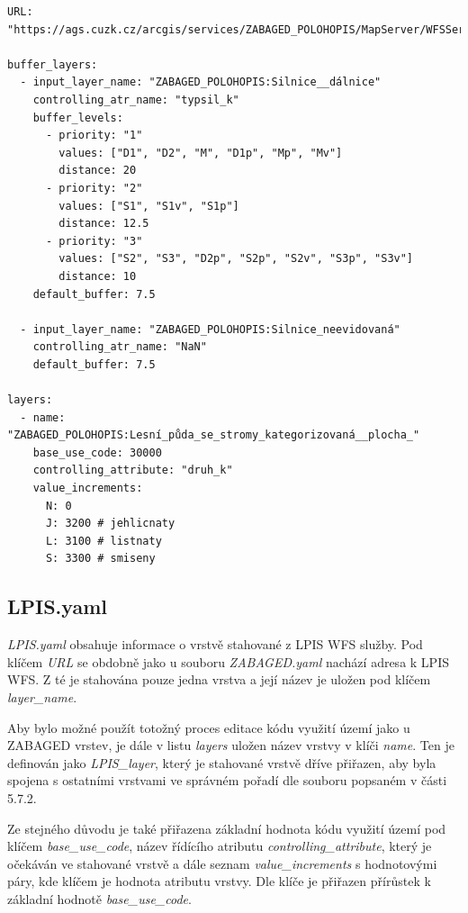 \documentclass[a4paper,oneside,12pt]{book}
\begin{document}
\begin{lstlisting}[style=myyaml, caption={Ukázka ZABAGED.yaml},label={kod:ZABAGED.yaml}]
URL: "https://ags.cuzk.cz/arcgis/services/ZABAGED_POLOHOPIS/MapServer/WFSServer"

buffer_layers:
  - input_layer_name: "ZABAGED_POLOHOPIS:Silnice__dálnice"
    controlling_atr_name: "typsil_k"
    buffer_levels:
      - priority: "1"
        values: ["D1", "D2", "M", "D1p", "Mp", "Mv"]
        distance: 20
      - priority: "2"
        values: ["S1", "S1v", "S1p"]
        distance: 12.5
      - priority: "3"
        values: ["S2", "S3", "D2p", "S2p", "S2v", "S3p", "S3v"]
        distance: 10
    default_buffer: 7.5

  - input_layer_name: "ZABAGED_POLOHOPIS:Silnice_neevidovaná"
    controlling_atr_name: "NaN"
    default_buffer: 7.5

layers:
  - name: "ZABAGED_POLOHOPIS:Lesní_půda_se_stromy_kategorizovaná__plocha_"
    base_use_code: 30000
    controlling_attribute: "druh_k"
    value_increments:
      N: 0
      J: 3200 # jehlicnaty
      L: 3100 # listnaty
      S: 3300 # smiseny
\end{lstlisting}

\subsection{LPIS.yaml} \label{LPIS.yaml}
\hspace{10mm} \textit{LPIS.yaml} obsahuje informace o vrstvě stahované z LPIS WFS služby. Pod klíčem \textit{URL} se obdobně jako u souboru \textit{ZABAGED.yaml} nachází adresa k LPIS WFS. Z té je stahována pouze jedna vrstva a její název je uložen pod klíčem \textit{layer\_name}.

\hspace{10mm} Aby bylo možné použít totožný proces editace kódu využití území jako u ZABAGED vrstev, je dále v listu \textit{layers}  uložen název vrstvy v klíči \textit{name}. Ten je definován jako \textit{LPIS\_layer}, který je stahované vrstvě dříve přiřazen, aby byla spojena s ostatními vrstvami ve správném pořadí dle souboru popsaném v části 5.7.2.

\hspace{10mm}Ze stejného důvodu je také přiřazena základní hodnota kódu využití území pod klíčem \textit{base\_use\_code}, název řídícího atributu \textit{controlling\_attribute}, který je očekáván ve stahované vrstvě a dále seznam \textit{value\_increments} s hodnotovými páry, kde klíčem je hodnota atributu vrstvy. Dle klíče je přiřazen přírůstek k základní hodnotě \textit{base\_use\_code}.
\end{document}
